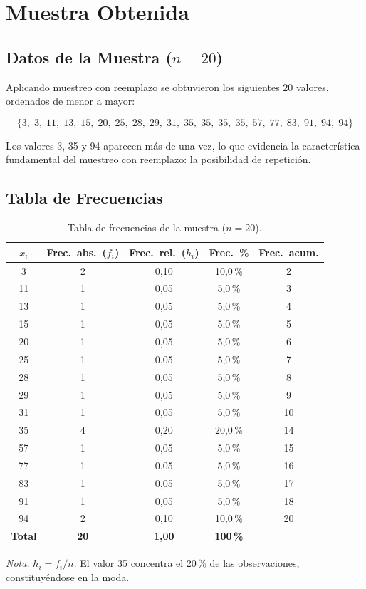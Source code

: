 \documentclass[12pt,a4paper]{article}
\begin{document}
\section{Muestra Obtenida}

\subsection{Datos de la Muestra ($n = 20$)}

Aplicando muestreo con reemplazo se obtuvieron los siguientes 20 valores, ordenados de
menor a mayor:

\[
  \{3,\; 3,\; 11,\; 13,\; 15,\; 20,\; 25,\; 28,\; 29,\; 31,\;
    35,\; 35,\; 35,\; 35,\; 57,\; 77,\; 83,\; 91,\; 94,\; 94\}
\]

Los valores 3, 35 y 94 aparecen más de una vez, lo que evidencia la característica fundamental
del muestreo con reemplazo: la posibilidad de repetición.

\subsection{Tabla de Frecuencias}

\begin{table}[H]
  \centering
  \caption{Tabla de frecuencias de la muestra ($n = 20$).}
  \begin{tabular}{ccccc}
    \toprule
    $x_i$ & Frec.\ abs.\ ($f_i$) & Frec.\ rel.\ ($h_i$) & Frec.\ \% & Frec.\ acum. \\
    \midrule
     3  & 2 & 0{,}10 & 10{,}0\,\% &  2 \\
    11  & 1 & 0{,}05 &  5{,}0\,\% &  3 \\
    13  & 1 & 0{,}05 &  5{,}0\,\% &  4 \\
    15  & 1 & 0{,}05 &  5{,}0\,\% &  5 \\
    20  & 1 & 0{,}05 &  5{,}0\,\% &  6 \\
    25  & 1 & 0{,}05 &  5{,}0\,\% &  7 \\
    28  & 1 & 0{,}05 &  5{,}0\,\% &  8 \\
    29  & 1 & 0{,}05 &  5{,}0\,\% &  9 \\
    31  & 1 & 0{,}05 &  5{,}0\,\% & 10 \\
    35  & 4 & 0{,}20 & 20{,}0\,\% & 14 \\
    57  & 1 & 0{,}05 &  5{,}0\,\% & 15 \\
    77  & 1 & 0{,}05 &  5{,}0\,\% & 16 \\
    83  & 1 & 0{,}05 &  5{,}0\,\% & 17 \\
    91  & 1 & 0{,}05 &  5{,}0\,\% & 18 \\
    94  & 2 & 0{,}10 & 10{,}0\,\% & 20 \\
    \midrule
    \textbf{Total} & \textbf{20} & \textbf{1{,}00} & \textbf{100\,\%} & \\
    \bottomrule
  \end{tabular}
  \par\smallskip
  \small\textit{Nota.} $h_i = f_i/n$. El valor 35 concentra el 20\,\% de las observaciones,
  constituyéndose en la moda.
\end{table}
\end{document}
